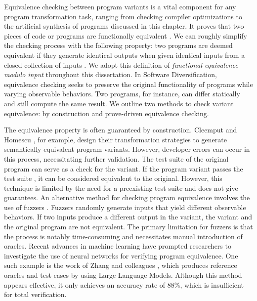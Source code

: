 \label{equivalence:checking}


Equivalence checking between program variants is a vital component for any program transformation task, ranging from checking compiler optimizations \cite{LeCompilers} to the artificial synthesis of programs discussed in this chapter. 
It proves that two pieces of code or programs are functionally equivalent \cite{churchill2019}. 
We can roughly simplify the checking process with the following property: 
two programs are deemed equivalent if they generate identical outputs when given identical inputs from a closed collection of inputs \cite{10.1145/2594291.2594334}.
We adopt this definition of \emph{functional equivalence modulo input} throughout this dissertation. 
In Software Diversification, equivalence checking seeks to preserve the original functionality of programs while varying observable behaviors. 
Two programs, for instance, can differ statically and still compute the same result. 
We outline two methods to check variant equivalence: by construction and prove-driven equivalence checking.


\begin{checking}
    \label{check_by_construction}
    The equivalence property is often guaranteed by construction. 
    Cleemput \etal \cite{Cleemput2012} and Homescu \etal \cite{homescu2013profile}, for example, design their transformation strategies to generate semantically equivalent program variants. 
    However, developer errors can occur in this process, necessitating further validation. 
    The test suite of the original program can serve as a check for the variant. 
    If the program variant passes the test suite \cite{harrand2020java}, it can be considered equivalent to the original. 
    However, this technique is limited by the need for a preexisting test suite and does not give guarantees. 
    An alternative method for checking program equivalence involves the use of fuzzers \cite{zalewski2017american}.
    Fuzzers randomly generate inputs that yield different observable behaviors. 
    If two inputs produce a different output in the variant, the variant and the original program are not equivalent. 
    The primary limitation for fuzzers is that the process is notably time-consuming and necessitates manual introduction of oracles.
    Recent advances in machine learning have prompted researchers to investigate the use of neural networks for verifying program equivalence.
    One such example is the work of Zhang and colleagues \cite{2023arXiv230514591Z}, which produces reference oracles and test cases by using Large Language Models.
    Although this method appears effective, it only achieves an accuracy rate of 88\%, which is insufficient for total verification.
\end{checking}

